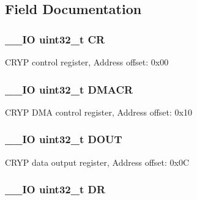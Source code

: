 \subsection{Field Documentation}
\hypertarget{struct_c_r_y_p___type_def_ab40c89c59391aaa9d9a8ec011dd0907a}{
\subsubsection[{C\-R}]{\setlength{\rightskip}{0pt plus 5cm}\-\_\-\-\_\-\-I\-O uint32\-\_\-t C\-R}}\label{struct_c_r_y_p___type_def_ab40c89c59391aaa9d9a8ec011dd0907a}
C\-R\-Y\-P control register, Address offset\-: 0x00 \hypertarget{struct_c_r_y_p___type_def_a082219a924d748e9c6092582aec06226}{
\subsubsection[{D\-M\-A\-C\-R}]{\setlength{\rightskip}{0pt plus 5cm}\-\_\-\-\_\-\-I\-O uint32\-\_\-t D\-M\-A\-C\-R}}\label{struct_c_r_y_p___type_def_a082219a924d748e9c6092582aec06226}
C\-R\-Y\-P D\-M\-A control register, Address offset\-: 0x10 \hypertarget{struct_c_r_y_p___type_def_ab8ba768d1dac54a845084bd07f4ef2b9}{
\subsubsection[{D\-O\-U\-T}]{\setlength{\rightskip}{0pt plus 5cm}\-\_\-\-\_\-\-I\-O uint32\-\_\-t D\-O\-U\-T}}\label{struct_c_r_y_p___type_def_ab8ba768d1dac54a845084bd07f4ef2b9}
C\-R\-Y\-P data output register, Address offset\-: 0x0\-C \hypertarget{struct_c_r_y_p___type_def_a3df0d8dfcd1ec958659ffe21eb64fa94}{
\subsubsection[{D\-R}]{\setlength{\rightskip}{0pt plus 5cm}\-\_\-\-\_\-\-I\-O uint32\-\_\-t D\-R}}\label{struct_c_r_y_p___type_def_a3df0d8dfcd1ec958659ffe21eb64fa94}

